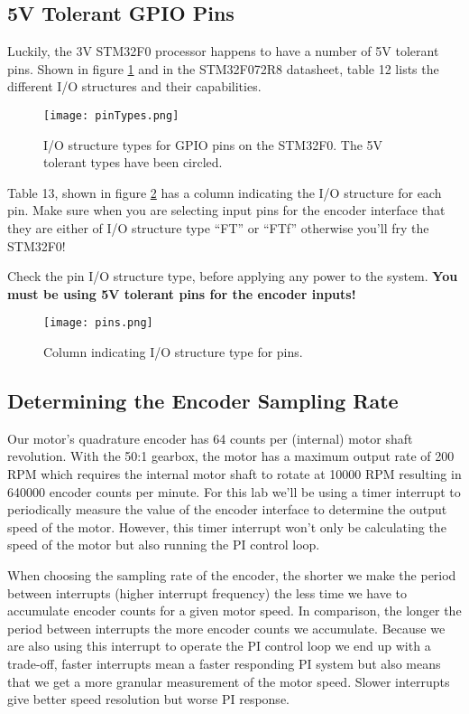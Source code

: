 \documentclass[11pt,fleqn]{book} %
\begin{document}
\subsection{5V Tolerant GPIO Pins}
Luckily, the 3V STM32F0 processor happens to have a number of 5V tolerant pins. Shown in figure \ref{pinTypes} and in the STM32F072R8 datasheet, table 12 lists the different I/O structures and their capabilities.  

\begin{figure}[tb]
    \centering\texttt{[image: pinTypes.png]}
    \caption{I/O structure types for GPIO pins on the STM32F0. The 5V tolerant types have been circled.}
    \label{pinTypes}
\end{figure}

Table 13, shown in figure \ref{pins} has a column indicating the I/O structure for each pin. Make sure when you are selecting input pins for the encoder interface that they are either of I/O structure type ``FT'' or ``FTf'' otherwise you'll fry the STM32F0!

\begin{warning}
    Check the pin I/O structure type, before applying any power to the system. \textbf{You must be using 5V tolerant pins for the encoder inputs!} 
\end{warning}



\begin{figure}[tb]
    \centering\texttt{[image: pins.png]}
    \caption{Column indicating I/O structure type for pins.}
    \label{pins}
\end{figure}

\subsection{Determining the Encoder Sampling Rate} \label{encoder_example}

Our motor's quadrature encoder has 64 counts per (internal) motor shaft revolution. With the 50:1 gearbox, the motor has a maximum output rate of 200 RPM which requires the internal motor shaft to rotate at 10000 RPM resulting in 640000 encoder counts per minute. For this lab we'll be using a timer interrupt to periodically measure the value of the encoder interface to determine the output speed of the motor. However, this timer interrupt won't only be calculating the speed of the motor but also running the PI control loop.

When choosing the sampling rate of the encoder, the shorter we make the period between interrupts (higher interrupt frequency) the less time we have to accumulate encoder counts for a given motor speed. In comparison, the longer the period between interrupts the more encoder counts we accumulate. 
Because we are also using this interrupt to operate the PI control loop we end up with a trade-off, faster interrupts mean a faster responding PI system but also means that we get a more granular measurement of the motor speed. Slower interrupts give better speed resolution but worse PI response.
\end{document}
